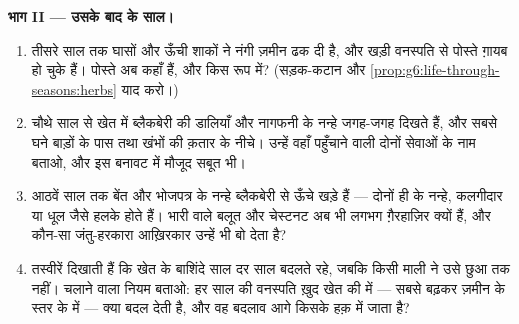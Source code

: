 \begin{problem}
\medskip\noindent\textbf{भाग II --- उसके बाद के साल।}
\begin{enumerate}[resume]
  \item तीसरे साल तक घासों और ऊँची शाकों ने नंगी ज़मीन ढक दी है, और
        खड़ी वनस्पति से पोस्ते ग़ायब हो चुके हैं। पोस्ते अब कहाँ हैं,
        और किस रूप में? (सड़क-कटान और
        \cref{prop:g6:life-through-seasons:herbs} याद करो।)
  \item चौथे साल से खेत में ब्लैकबेरी की डालियाँ और नागफनी के नन्हे
         जगह-जगह दिखते हैं, और सबसे घने बाड़ों के पास तथा खंभों की
        क़तार के नीचे। उन्हें वहाँ पहुँचाने वाली दोनों सेवाओं के नाम
        बताओ, और इस बनावट में मौजूद सबूत भी।
  \item आठवें साल तक बेंत और भोजपत्र के नन्हे  ब्लैकबेरी से ऊँचे
        खड़े हैं --- दोनों ही  के  नन्हे, कलगीदार या धूल जैसे
        हलके होते हैं। भारी  वाले बलूत और चेस्टनट अब भी लगभग
        ग़ैरहाज़िर क्यों हैं, और कौन-सा जंतु-हरकारा आख़िरकार उन्हें भी
        बो देता है?
  \item तस्वीरें दिखाती हैं कि खेत के बाशिंदे साल दर साल बदलते रहे,
        जबकि किसी माली ने उसे छुआ तक नहीं। चलाने वाला नियम बताओ: हर
        साल की वनस्पति ख़ुद खेत की  में --- सबसे बढ़कर
        ज़मीन के स्तर के  में --- क्या बदल देती है, और वह बदलाव
        आगे किसके हक़ में जाता है?
\end{enumerate}


\end{problem}
